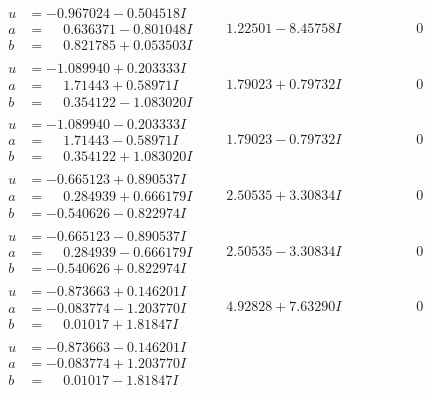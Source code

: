 \documentclass[1p]{elsarticle_modified}
\theoremstyle{definition}
\begin{document}
$$\begin{array}{c|c|c}
\begin{aligned}
u &= -0.967024 - 0.504518 I \\
a &= \phantom{-}0.636371 - 0.801048 I \\
b &= \phantom{-}0.821785 + 0.053503 I\end{aligned}
 & \phantom{-}1.22501 - 8.45758 I & \phantom{-0.000000 } 0 \\ \hline\begin{aligned}
u &= -1.089940 + 0.203333 I \\
a &= \phantom{-}1.71443 + 0.58971 I \\
b &= \phantom{-}0.354122 - 1.083020 I\end{aligned}
 & \phantom{-}1.79023 + 0.79732 I & \phantom{-0.000000 } 0 \\ \hline\begin{aligned}
u &= -1.089940 - 0.203333 I \\
a &= \phantom{-}1.71443 - 0.58971 I \\
b &= \phantom{-}0.354122 + 1.083020 I\end{aligned}
 & \phantom{-}1.79023 - 0.79732 I & \phantom{-0.000000 } 0 \\ \hline\begin{aligned}
u &= -0.665123 + 0.890537 I \\
a &= \phantom{-}0.284939 + 0.666179 I \\
b &= -0.540626 - 0.822974 I\end{aligned}
 & \phantom{-}2.50535 + 3.30834 I & \phantom{-0.000000 } 0 \\ \hline\begin{aligned}
u &= -0.665123 - 0.890537 I \\
a &= \phantom{-}0.284939 - 0.666179 I \\
b &= -0.540626 + 0.822974 I\end{aligned}
 & \phantom{-}2.50535 - 3.30834 I & \phantom{-0.000000 } 0 \\ \hline\begin{aligned}
u &= -0.873663 + 0.146201 I \\
a &= -0.083774 - 1.203770 I \\
b &= \phantom{-}0.01017 + 1.81847 I\end{aligned}
 & \phantom{-}4.92828 + 7.63290 I & \phantom{-0.000000 } 0 \\ \hline\begin{aligned}
u &= -0.873663 - 0.146201 I \\
a &= -0.083774 + 1.203770 I \\
b &= \phantom{-}0.01017 - 1.81847 I\end{aligned}

\end{array}$$
\end{document}
